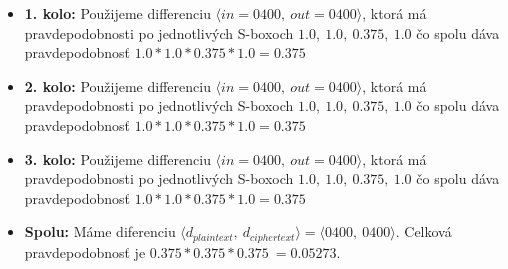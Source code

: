 \begin{itemize}
\item {\bf 1. kolo:}
Použijeme differenciu $\langle in= 0400 ,\ out= 0400 \rangle $,
ktorá má pravdepodobnosti po jednotlivých S-boxoch $
1.0,\ 1.0,\ 0.375,\ 1.0
$ čo spolu dáva pravdepodobnosť 
$ 1.0*1.0*0.375*1.0 = 0.375 $

\item {\bf 2. kolo:}
Použijeme differenciu $\langle in= 0400 ,\ out= 0400 \rangle $,
ktorá má pravdepodobnosti po jednotlivých S-boxoch $
1.0,\ 1.0,\ 0.375,\ 1.0
$ čo spolu dáva pravdepodobnosť 
$ 1.0*1.0*0.375*1.0 = 0.375 $

\item {\bf 3. kolo:}
Použijeme differenciu $\langle in= 0400 ,\ out= 0400 \rangle $,
ktorá má pravdepodobnosti po jednotlivých S-boxoch $
1.0,\ 1.0,\ 0.375,\ 1.0
$ čo spolu dáva pravdepodobnosť 
$ 1.0*1.0*0.375*1.0 = 0.375 $

\item {\bf Spolu:}  Máme diferenciu $\langle d_{plaintext},\  d_{ciphertext} \rangle = \langle 0400 ,\  0400 \rangle$.
Celková pravdepodobnosť je $ 0.375*0.375*0.375 ~= 0.05273 $.
\end{itemize}
